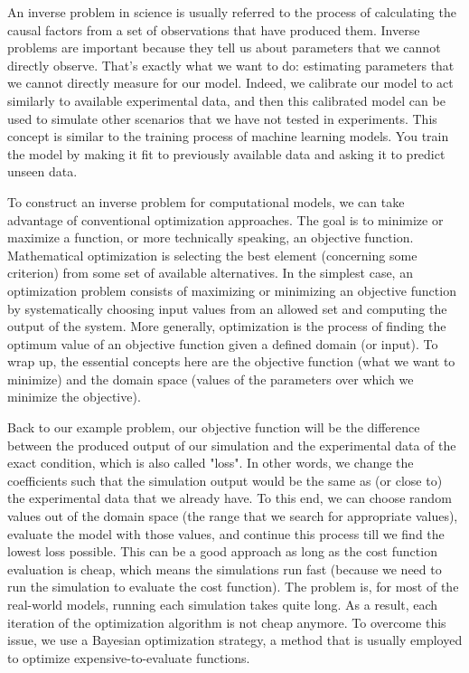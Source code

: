 \begin{subappendices}
An inverse problem in science is usually referred to the process of calculating the causal factors from a set of observations that have produced them. Inverse problems are important because they tell us about parameters that we cannot directly observe. That's exactly what we want to do: estimating parameters that we cannot directly measure for our model. Indeed, we calibrate our model to act similarly to available experimental data, and then this calibrated model can be used to simulate other scenarios that we have not tested in experiments. This concept is similar to the training process of machine learning models. You train the model by making it fit to previously available data and asking it to predict unseen data.

To construct an inverse problem for computational models, we can take advantage of conventional optimization approaches. The goal is to minimize or maximize a function, or more technically speaking, an objective function. Mathematical optimization is selecting the best element (concerning some criterion) from some set of available alternatives.  In the simplest case, an optimization problem consists of maximizing or minimizing an objective function by systematically choosing input values from an allowed set and computing the output of the system. More generally, optimization is the process of finding the optimum value of an objective function given a defined domain (or input). To wrap up, the essential concepts here are the objective function (what we want to minimize) and the domain space (values of the parameters over which we minimize the objective).

Back to our example problem, our objective function will be the difference between the produced output of our simulation and the experimental data of the exact condition, which is also called "loss". In other words, we change the coefficients such that the simulation output would be the same as (or close to) the experimental data that we already have. To this end, we can choose random values out of the domain space (the range that we search for appropriate values), evaluate the model with those values, and continue this process till we find the lowest loss possible. This can be a good approach as long as the cost function evaluation is cheap, which means the simulations run fast (because we need to run the simulation to evaluate the cost function). The problem is, for most of the real-world models, running each simulation takes quite long. As a result, each iteration of the optimization algorithm is not cheap anymore. To overcome this issue, we use a Bayesian optimization strategy, a method that is usually employed to optimize expensive-to-evaluate functions.


\end{subappendices}
